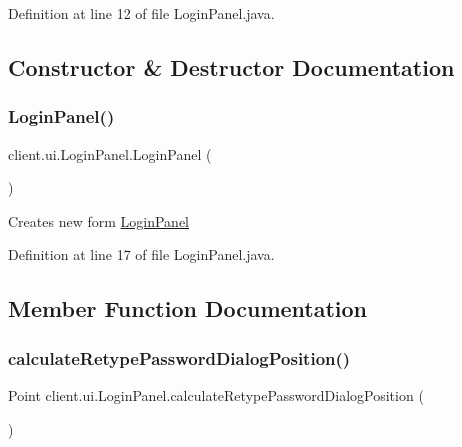 Definition at line 12 of file Login\+Panel.\+java.



\subsection{Constructor \& Destructor Documentation}
\hypertarget{classclient_1_1ui_1_1_login_panel_a697f38b937f048e562c634c713d90885}{}\label{classclient_1_1ui_1_1_login_panel_a697f38b937f048e562c634c713d90885} 
\subsubsection{\texorpdfstring{Login\+Panel()}{LoginPanel()}}
{\footnotesize\ttfamily client.\+ui.\+Login\+Panel.\+Login\+Panel (\begin{DoxyParamCaption}{ }\end{DoxyParamCaption})}

Creates new form \hyperlink{classclient_1_1ui_1_1_login_panel}{Login\+Panel} 

Definition at line 17 of file Login\+Panel.\+java.



\subsection{Member Function Documentation}
\hypertarget{classclient_1_1ui_1_1_login_panel_a9726aa2bc3416aa22ad43d2b4b9eed70}{}\label{classclient_1_1ui_1_1_login_panel_a9726aa2bc3416aa22ad43d2b4b9eed70} 
\subsubsection{\texorpdfstring{calculate\+Retype\+Password\+Dialog\+Position()}{calculateRetypePasswordDialogPosition()}}
{\footnotesize\ttfamily Point client.\+ui.\+Login\+Panel.\+calculate\+Retype\+Password\+Dialog\+Position (\begin{DoxyParamCaption}{ }\end{DoxyParamCaption})}



